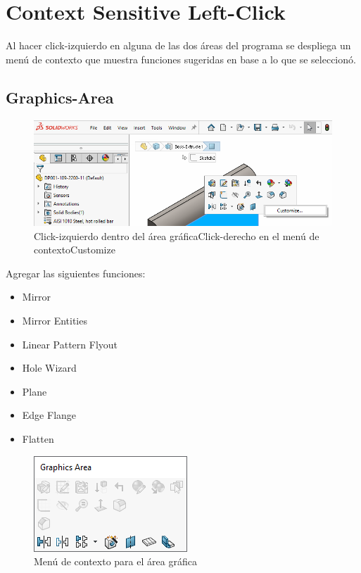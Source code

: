 \documentclass{report}
\begin{document}
\chapter{Context Sensitive Left-Click}

Al hacer click-izquierdo en alguna de las dos áreas del programa se despliega un menú de contexto que muestra funciones sugeridas en base a lo que se seleccionó.

\section{Graphics-Area}

\begin{figure}[H]
	\centering
	\includegraphics[width=0.85\linewidth, height=0.5\textheight,keepaspectratio]{Imagenes/solidworks_contextmenu_01}
	\caption{Click-izquierdo dentro del área gráfica\textrightarrow Click-derecho en el menú de contexto\textrightarrow Customize}
	\label{fig:solidworkscontextmenu01}
\end{figure}

Agregar las siguientes funciones:

\begin{itemize}
	\item Mirror
	\item Mirror Entities
	\item Linear Pattern Flyout
	\item Hole Wizard
	\item Plane
	\item Edge Flange
	\item Flatten
\end{itemize}

\begin{figure}[H]
	\centering
	\includegraphics[width=0.55\linewidth, height=0.5\textheight,keepaspectratio]{Imagenes/solidworks_contextmenu_02}
	\caption{Menú de contexto para el área gráfica}
	\label{fig:solidworkscontextmenu02}
\end{figure}
\end{document}
